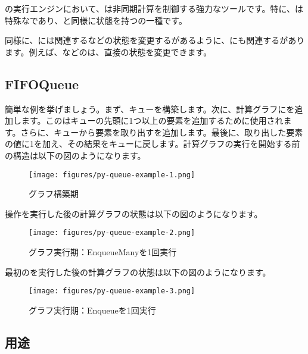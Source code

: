 \begin{content}

の実行エンジンにおいて、は非同期計算を制御する強力なツールです。特に、は特殊なであり、と同様に状態を持つの一種です。

同様に、には関連するなどの状態を変更するがあるように、にも関連するがあります。例えば、などのは、直接の状態を変更できます。

\subsection{FIFOQueue}

簡単な例を挙げましょう。まず、キューを構築します。次に、計算グラフにを追加します。このはキューの先頭に1つ以上の要素を追加するために使用されます。さらに、キューから要素を取り出すを追加します。最後に、取り出した要素の値に1を加え、その結果をキューに戻します。計算グラフの実行を開始する前の構造は以下の図のようになります。

\begin{figure}[!h]
\centering
\texttt{[image: figures/py-queue-example-1.png]}
\caption{グラフ構築期}
 \label{fig:py-queue-example-1}
\end{figure}

操作を実行した後の計算グラフの状態は以下の図のようになります。

\begin{figure}[!h]
\centering
\texttt{[image: figures/py-queue-example-2.png]}
\caption{グラフ実行期：EnqueueManyを1回実行}
 \label{fig:py-queue-example-2}
\end{figure}

最初のを実行した後の計算グラフの状態は以下の図のようになります。

\begin{figure}[!h]
\centering
\texttt{[image: figures/py-queue-example-3.png]}
\caption{グラフ実行期：Enqueueを1回実行}
 \label{fig:py-queue-example-3}
\end{figure}

\subsection{用途}


\end{content}
